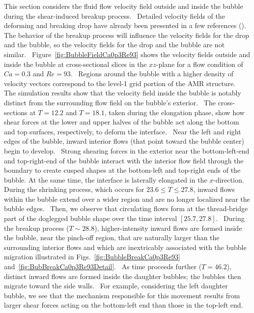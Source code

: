 \documentclass{elsarticle}
\begin{document}
{
This section considers the fluid flow velocity field outside and inside the bubble during the shear-induced breakup process.  Detailed velocity fields of the deforming and breaking drop have already been presented in a few references (\citet{LiRenRen00, RenCri01-1}).  The behavior of the breakup process will influence the velocity fields for the drop and the bubble, so the velocity fields for the drop and the bubble are not similar.  Figure~\ref{fig:BubbleFieldCa0p3Re93} shows the velocity fields outside and inside the bubble at cross-sectional slices in the $xz$-plane for a flow condition of $Ca = 0.3$ and $Re = 93$.  Regions around the bubble with a higher density of velocity vectors correspond to the level-1 grid portion of the AMR structure.  The simulation results show that the velocity field inside the bubble is notably distinct from the surrounding flow field on the bubble's exterior.  The cross-sections at $T=12.2$ and $T=18.1$, taken during the elongation phase, show how shear forces at the lower and upper halves of the bubble act along the bottom and top surfaces, respectively, to deform the interface.  Near the left and right edges of the bubble, inward interior flows (that point toward the bubble center) begin to develop.  Strong shearing forces in the exterior near the bottom-left-end and top-right-end of the bubble interact with the interior flow field through the boundary to create cusped shapes at the bottom-left and top-right ends of the bubble. At the same time, the interface is laterally elongated in the $x$-direction.  During the shrinking process, which occurs for $23.6 \leq T \leq 27.8$, inward flows within the bubble extend over a wider region and are no longer localized near the bubble edges.  Then, we observe that circulating flows form at the thread-bridge part of the doglegged bubble shape over the time interval $[25.7, 27.8]$.  During the breakup process ($T \sim 28.8$), higher-intensity inward flows are formed inside the bubble, near the pinch-off region, that are naturally larger than the surrounding interior flows and which are inextricably associated with the bubble migration illustrated in Figs.~\ref{fig:BubbleBreakCa0p3Re93} and~\ref{fig:BubBreakCa0p3Re93Detail}.  As time proceeds further ($T =  46.2$), distinct inward flows are formed inside the daughter bubbles; the bubbles then migrate toward the side walls.  For example, considering the left daughter bubble, we see that the mechanism responsible for this movement results from larger shear forces acting on the bottom-left end than those in the top-left end.
}
\end{document}
